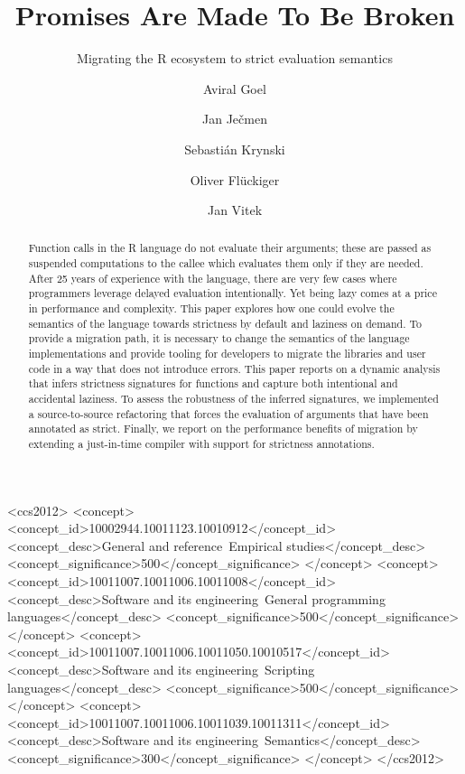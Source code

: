 \documentclass[review,nonacm,screen,acmsmall,anonymous=true]{acmart}
\begin{document}
\title{Promises Are Made To Be Broken}
\subtitle{Migrating the R ecosystem to strict evaluation semantics}

\author{Aviral Goel}
\author{Jan Ječmen}
\author{Sebastián Krynski}
\author{Oliver Flückiger}
\author{Jan Vitek}
\authorsaddresses{}
\renewcommand{\shortauthors}{Goel, Vitek}

\begin{abstract}
  Function calls in the R language do not evaluate their arguments; these are
  passed as suspended computations to the callee which evaluates them only if
  they are needed. After 25 years of experience with the language, there are
  very few cases where programmers leverage delayed evaluation intentionally.
  Yet being lazy comes at a price in performance and complexity. This paper
  explores how one could evolve the semantics of the language towards strictness
  by default and laziness on demand. To provide a migration path, it is
  necessary to change the semantics of the language implementations and provide
  tooling for developers to migrate the libraries and user code in a way that
  does not introduce errors. This paper reports on a dynamic analysis that
  infers strictness signatures for functions and capture both intentional and
  accidental laziness. To assess the robustness of the inferred signatures, we
  implemented a source-to-source refactoring that forces the evaluation of
  arguments that have been annotated as strict. Finally, we report on the
  performance benefits of migration by extending a just-in-time compiler with
  support for strictness annotations.
\end{abstract}

\begin{CCSXML}
<ccs2012>
<concept>
<concept_id>10002944.10011123.10010912</concept_id>
<concept_desc>General and reference~Empirical studies</concept_desc>
<concept_significance>500</concept_significance>
</concept>
<concept>
<concept_id>10011007.10011006.10011008</concept_id>
<concept_desc>Software and its engineering~General programming languages</concept_desc>
<concept_significance>500</concept_significance>
</concept>
<concept>
<concept_id>10011007.10011006.10011050.10010517</concept_id>
<concept_desc>Software and its engineering~Scripting languages</concept_desc>
<concept_significance>500</concept_significance>
</concept>
<concept>
<concept_id>10011007.10011006.10011039.10011311</concept_id>
<concept_desc>Software and its engineering~Semantics</concept_desc>
<concept_significance>300</concept_significance>
</concept>
</ccs2012>
\end{CCSXML}
\end{document}

